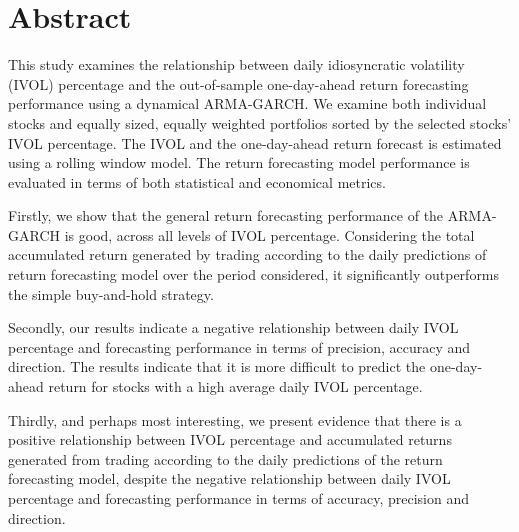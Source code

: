 \chapter{Abstract}
This study examines the relationship between daily idiosyncratic volatility (IVOL) percentage and the out-of-sample one-day-ahead return forecasting performance using a dynamical ARMA-GARCH. We examine both individual stocks and equally sized, equally weighted portfolios sorted by the selected stocks' IVOL percentage. The IVOL and the one-day-ahead return forecast is estimated using a rolling window model. The return forecasting model performance is evaluated in terms of both statistical and economical metrics.

Firstly, we show that the general return forecasting performance of the ARMA-GARCH is good, across all levels of IVOL percentage. Considering the total accumulated return generated by trading according to the daily predictions of return forecasting model over the period considered, it significantly outperforms the simple buy-and-hold strategy.

Secondly, our results indicate a negative relationship between daily IVOL percentage and forecasting performance in terms of precision, accuracy and direction. The results indicate that it is more difficult to predict the one-day-ahead return for stocks with a high average daily IVOL percentage.

Thirdly, and perhaps most interesting, we present evidence that there is a positive relationship between IVOL percentage and accumulated returns generated from trading according to the daily predictions of the return forecasting model, despite the negative relationship between daily IVOL percentage and forecasting performance in terms of accuracy, precision and direction.


